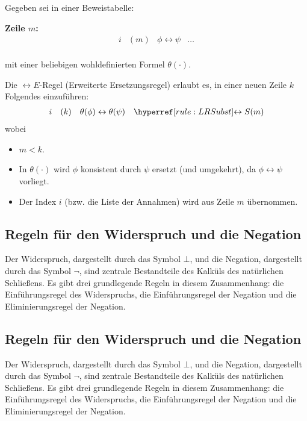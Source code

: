 \documentclass[main.tex]{subfiles}
\begin{document}
\begin{definition}
Gegeben sei in einer Beweistabelle:

\textbf{Zeile \(m\):}
\[
\begin{array}{llll}
   i & (m) & \phi \leftrightarrow \psi & \dots \\
\end{array}
\]

mit einer beliebigen wohldefinierten Formel \(\theta(\cdot)\). 

Die \(\leftrightarrow E\)-Regel (Erweiterte Ersetzungsregel) erlaubt es, in einer neuen Zeile \(k\) Folgendes einzuführen:
\[
\begin{array}{llll}
   i & (k) & \theta(\phi) \leftrightarrow \theta(\psi) & \rLRS{m}
\end{array}
\]
wobei
\begin{itemize}
    \item \(m < k\).
    \item In \(\theta(\cdot)\) wird \(\phi\) konsistent durch \(\psi\) ersetzt (und umgekehrt), da \(\phi \leftrightarrow \psi\) vorliegt.
    \item Der Index \(i\) (bzw. die Liste der Annahmen) wird aus Zeile \(m\) übernommen.
\end{itemize}
\end{definition}

\subsection{Regeln für den Widerspruch und die Negation}

Der Widerspruch, dargestellt durch das Symbol \(\bot\), und die Negation, dargestellt durch das Symbol \(\neg\), sind zentrale Bestandteile des Kalküls des natürlichen Schließens. Es gibt drei grundlegende Regeln in diesem Zusammenhang: die Einführungsregel des Widerspruchs, die Einführungsregel der Negation und die Eliminierungsregel der Negation.

\subsection{Regeln für den Widerspruch und die Negation}

Der Widerspruch, dargestellt durch das Symbol \(\bot\), und die Negation, dargestellt durch das Symbol \(\neg\), sind zentrale Bestandteile des Kalküls des natürlichen Schließens. Es gibt drei grundlegende Regeln in diesem Zusammenhang: die Einführungsregel des Widerspruchs, die Einführungsregel der Negation und die Eliminierungsregel der Negation.
\end{document}
